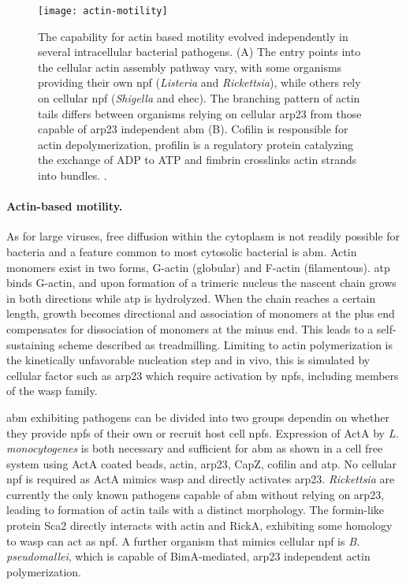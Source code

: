 \begin{figure}
  \centering
  \texttt{[image: actin-motility]}
  \caption[Mechanisms of actin based motility in several intracellular bacterial pathogens.]{The capability for actin based motility evolved independently in several intracellular bacterial pathogens. (A) The entry points into the cellular actin assembly pathway vary, with some organisms providing their own \acrlong{npf} (\textit{Listeria} and \textit{Rickettsia}), while others rely on cellular \gls{npf} (\textit{Shigella} and \acrlong{ehec}). The branching pattern of actin tails differs between organisms relying on cellular \gls{arp23} from those capable of \gls{arp23} independent \gls{abm} (B). Cofilin is responsible for actin depolymerization, profilin is a regulatory protein catalyzing the exchange of ADP to ATP and fimbrin crosslinks actin strands into bundles. \citep{Haglund2011}.}
  \label{fig:actin-motility}
\end{figure}

\label{actin-motility}
\paragraph{Actin-based motility.}
As for large viruses, free diffusion within the cytoplasm is not readily possible for bacteria and a feature common to most cytosolic bacterial is 
\gls{abm}. Actin monomers exist in two forms, G-actin (globular) and F-actin (filamentous). \Gls{atp} binds G-actin, and upon formation of a trimeric nucleus the nascent chain grows in both directions while \gls{atp} is hydrolyzed. When the chain reaches a certain length, growth becomes directional and association of monomers at the plus end compensates for dissociation of monomers at the minus end. This leads to a self-sustaining scheme described as treadmilling. Limiting to actin polymerization is the kinetically unfavorable nucleation step and in vivo, this is simulated by cellular factor such as \gls{arp23} which require activation by \glspl{npf}, including members of the \gls{wasp} family.

\Gls{abm} exhibiting pathogens can be divided into two groups dependin on whether they provide \glspl{npf} of their own or recruit host cell \glspl{npf}. Expression of ActA by \textit{L. monocytogenes} is both necessary and sufficient for \gls{abm} as shown in a cell free system using ActA coated beads, actin, \gls{arp23}, CapZ, cofilin and \gls{atp}. No cellular \gls{npf} is required as ActA mimics \gls{wasp} and directly activates \gls{arp23}. \textit{Rickettsia} are currently the only known pathogens capable of \gls{abm} without relying on \gls{arp23}, leading to formation of actin tails with a distinct morphology. The formin-like protein Sca2 directly interacts with actin and RickA, exhibiting some homology to \gls{wasp} can act as \gls{npf}. A further organism that mimics cellular \gls{npf} is \textit{B. pseudomallei}, which is capable of BimA-mediated, \gls{arp23} independent actin polymerization.

